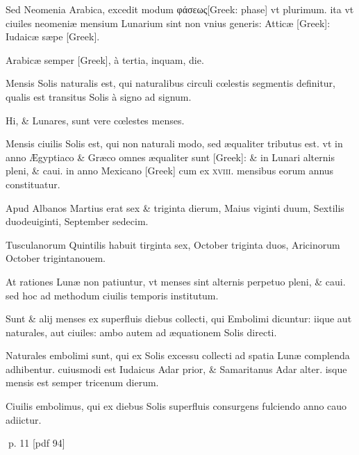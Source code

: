 \begin{parnumbers}
Sed Neomenia Arabica, excedit modum \textgreek{φάσεως[Greek: phase]} vt plurimum. ita vt ciuiles neomeniæ mensium Lunarium sint non vnius generis: Atticæ  \textgreek{[Greek]}: Iudaicæ sæpe \textgreek{[Greek]}.

Arabicæ semper \textgreek{[Greek]}, à tertia, inquam, die.

Mensis Solis naturalis est, qui naturalibus circuli cœlestis segmentis definitur, qualis est transitus Solis à signo ad signum.

Hi, \& Lunares, sunt vere cœlestes menses.

Mensis ciuilis Solis est, qui non naturali modo, sed æqualiter tributus est. vt in anno Ægyptiaco \& Græco omnes æqualiter sunt \textgreek{[Greek]}: \& in Lunari alternis pleni, \& caui. in anno Mexicano \textgreek{[Greek]} cum ex
\textsc{xviii}. mensibus eorum annus constituatur.

Apud Albanos Martius erat sex \& triginta dierum, Maius viginti duum, Sextilis duodeuiginti, September sedecim.

Tusculanorum Quintilis habuit tirginta sex, October triginta duos, Aricinorum October trigintanouem.

At rationes Lunæ non patiuntur, vt menses sint alternis perpetuo pleni, \& caui. sed hoc ad methodum ciuilis temporis institutum.

Sunt \& alij menses ex superfluis diebus collecti, qui Embolimi dicuntur: iique aut naturales, aut ciuiles: ambo autem ad æquationem Solis directi.

Naturales embolimi sunt, qui ex Solis excessu collecti ad spatia Lunæ complenda adhibentur. cuiusmodi est Iudaicus Adar prior, \& Samaritanus Adar alter. isque mensis est semper tricenum dierum.

Ciuilis embolimus, qui ex diebus Solis superfluis consurgens fulciendo anno cauo adiictur.

\end{parnumbers}
\clearpage
p. 11 [pdf 94]

